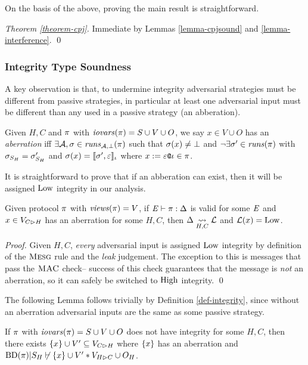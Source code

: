 On the basis of the above, proving the main result is straightforward.
\begin{proof}[Theorem \ref{theorem-cpj}]
  Immediate by Lemmas \ref{lemma-cpjsound} and \ref{lemma-interference}. \qed
\end{proof}

\subsubsection{Integrity Type Soundness}

A key observation is that, to undermine integrity adversarial strategies
must be different from passive strategies, in particular at least one
adversarial input must be different than any used in a passive strategy
(an abberation). 
\begin{definition}
  Given $H,C$ and $\pi$ with $\mathit{iovars}(\pi) = S \cup V \cup O$,
  we say $x \in V \cup O$ has an \emph{aberration} iff
  $\exists \mathcal{A}, \sigma \in \mathit{runs}_{\mathcal{A},\bot}(\pi)$ such that
  $\sigma(x) \ne \bot$ and $\neg\exists \sigma' \in \mathit{runs}(\pi)$
  with  $\sigma_{S_H} = \sigma'_{S_H}$ and
  $\sigma(x) = \llbracket \sigma',\varepsilon \rrbracket_{\iota}$ where
  $x := \varepsilon\texttt{@}\iota \in \pi$.
\end{definition}
It is straightforward to prove that if an abberation can
exist, then it will be assigned $\mathrm{Low}$ integrity in our
analysis. 
\begin{lemma}
  \label{lemma-aberration-low}
  Given protocol $\pi$ with
  $\mathit{views}(\pi) = V$, if 
  $\mathit{E} \vdash \pi : \Delta$ is valid
  for some $\mathit{E}$ and $x \in V_{C \rhd H}$ has an
  aberration for some $H,C$, then $\Delta \underset{H,C}{\leadsto} \mathcal{L}$
  and $\mathcal{L}(x) = \mathrm{Low}$.
\end{lemma}
\begin{proof}
  Given $H,C$, \emph{every} adversarial input is assigned $\mathrm{Low}$
  integrity by definition of the $\text{\sc Mesg}$ rule and the
  \emph{leak} judgement.  The exception to this is messages that pass
  the $\text{\sc MAC}$ check-- success of this check guarantees that
  the message is \emph{not} an aberration, so it can safely be
  switched to $\mathrm{High}$ integrity. \qed
\end{proof}
The following Lemma follows trivially by Definition \ref{def-integrity},
since without an aberration adversarial inputs are the same as some passive
strategy.
\begin{lemma}
  \label{lemma-undermined-logic}
  If $\pi$ with $\mathit{iovars}(\pi) = S \cup V \cup O$ does not have
  integrity for some $H,C$, then there exists $\{ x \} \cup V'
  \subseteq V_{C \rhd H}$ where $\{ x \}$ has an aberration and
  $\mathrm{BD}(\pi)|S_H \not\vdash \{ x \} \cup V' * V_{H \rhd C} \cup O_H$.
\end{lemma}

